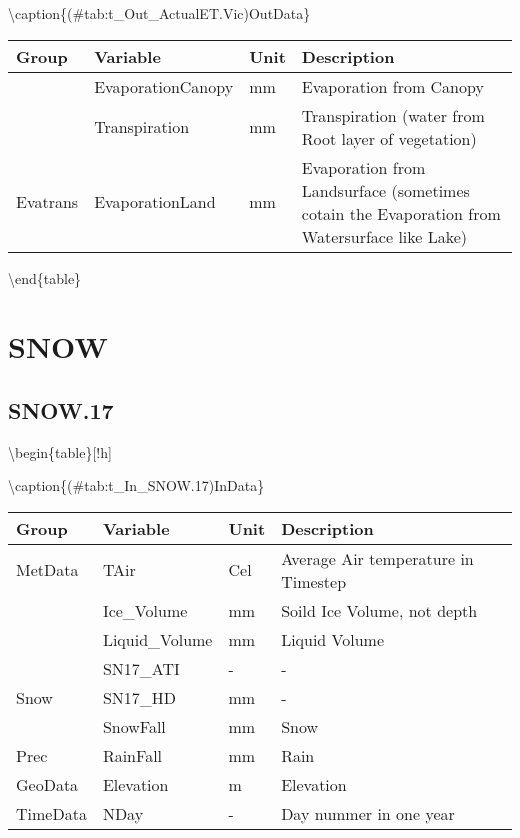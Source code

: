 \documentclass[
]{book}
\begin{document}
\textbackslash caption\{(\#tab:t\_Out\_ActualET.Vic)OutData\}
\centering

\begin{tabular}[t]{l|l|l|l}
\hline
Group & Variable & Unit & Description\\
\hline
 & EvaporationCanopy & mm & Evaporation from Canopy\\
\cline{2-4}
 & Transpiration & mm & Transpiration (water from Root layer of vegetation)\\
\cline{2-4}
\multirow{-3}{*}{\raggedright\arraybackslash Evatrans} & EvaporationLand & mm & Evaporation from Landsurface (sometimes cotain the Evaporation from Watersurface like Lake)\\
\hline
\end{tabular}

\textbackslash end\{table\}

\hypertarget{snow}{%
\section{SNOW}\label{snow}}

\hypertarget{snow.17}{%
\subsection{SNOW.17}\label{snow.17}}

\textbackslash begin\{table\}{[}!h{]}

\textbackslash caption\{(\#tab:t\_In\_SNOW.17)InData\}
\centering

\begin{tabular}[t]{l|l|l|l}
\hline
Group & Variable & Unit & Description\\
\hline
MetData & TAir & Cel & Average Air temperature in Timestep\\
\cline{1-4}
 & Ice\_Volume & mm & Soild Ice Volume, not depth\\
\cline{2-4}
 & Liquid\_Volume & mm & Liquid Volume\\
\cline{2-4}
 & SN17\_ATI & - & -\\
\cline{2-4}
\multirow{-4}{*}{\raggedright\arraybackslash Snow} & SN17\_HD & mm & -\\
\cline{1-4}
 & SnowFall & mm & Snow\\
\cline{2-4}
\multirow{-2}{*}{\raggedright\arraybackslash Prec} & RainFall & mm & Rain\\
\cline{1-4}
GeoData & Elevation & m & Elevation\\
\cline{1-4}
TimeData & NDay & - & Day nummer in one year\\
\hline
\end{tabular}
\end{document}
